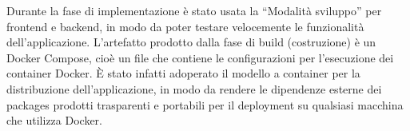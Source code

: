 Durante la fase di implementazione è stato usata la ``Modalità sviluppo'' per frontend e backend, in modo da poter testare velocemente le funzionalità dell'applicazione. L'artefatto prodotto dalla fase di build (costruzione) è un Docker Compose, cioè un file che contiene le configurazioni per l'esecuzione dei container Docker. È stato infatti adoperato il modello a container per la distribuzione dell'applicazione, in modo da rendere le dipendenze esterne dei packages prodotti trasparenti e portabili per il deployment su qualsiasi macchina che utilizza Docker.\\